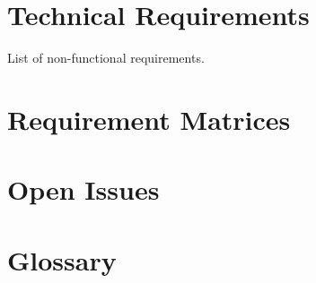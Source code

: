\documentclass[12pt]{article}
\begin{document}
\section{Technical Requirements}
List of non-functional requirements.

\section{Requirement Matrices}

\section{Open Issues}

\section{Glossary}
\end{document}
